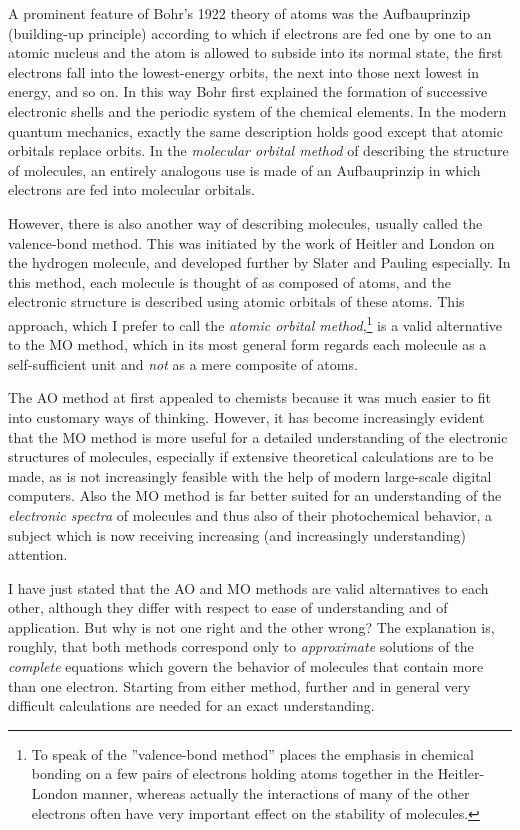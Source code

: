 \documentclass[11pt]{memoir}
\begin{document}
A prominent feature of Bohr's 1922 theory of atoms was the Aufbauprinzip (build\-ing-up principle) according to which if electrons are fed one by one to an atomic nucleus and the atom is allowed to subside into its normal state, the first electrons fall into the lowest-energy orbits, the next into those next lowest in energy, and so on.  In this way Bohr first explained the formation of successive electronic shells and the periodic system of the chemical elements.  In the modern quantum mechanics, exactly the same description holds good except that atomic orbitals replace orbits.  In the \emph{molecular orbital method} of describing the structure of molecules, an entirely analogous use is made of an Aufbauprinzip in which electrons are fed into molecular orbitals.

However, there is also another way of describing molecules, usually called the valence-bond method.  This was initiated by the work of Heitler and London on the hydrogen molecule, and developed further by Slater and Pauling especially.  In this method, each molecule is thought of as composed of atoms, and the electronic structure is described using atomic orbitals of these atoms.  This approach, which I prefer to call the \emph{atomic orbital method},\footnote{To speak of the ''valence-bond method'' places the emphasis in chemical bonding on a few pairs of electrons holding atoms together in the Heitler-London manner, whereas actually the interactions of many of the other electrons often have very important effect on the stability of molecules.} is a valid alternative to the MO method, which in its most general form regards each molecule as a self-sufficient unit and \emph{not} as a mere composite of atoms.

The AO method at first appealed to chemists because it was much easier to fit into customary ways of thinking.  However, it has become increasingly evident that the MO method is more useful for a detailed understanding of the electronic structures of molecules, especially if extensive theoretical calculations are to be made, as is not increasingly feasible with the help of modern large-scale digital computers.  Also the MO method is far better suited for an understanding of the \emph{electronic spectra} of molecules and thus also of their photochemical behavior, a subject which is now receiving increasing (and increasingly understanding) attention.

I have just stated that the AO and MO methods are valid alternatives to each other, although they differ with respect to ease of understanding and of application.  But why is not one right and the other wrong?  The explanation is, roughly, that both methods correspond only to \emph{approximate} solutions of the \emph{complete} equations which govern the behavior of molecules that contain more than one electron.  Starting from either method, further and in general very difficult calculations are needed for an exact understanding.
\end{document}
